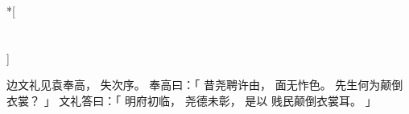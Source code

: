 
\switchcolumn[0]*[\section{}]

边文礼见袁奉高，
失次序。
奉高曰：「
    昔尧聘许由，
    面无怍色。
    先生何为颠倒衣裳？
」
文礼答曰：「
    明府初临，
    尧德未彰，
    是以
    贱民颠倒衣裳耳。
」

\switchcolumn



